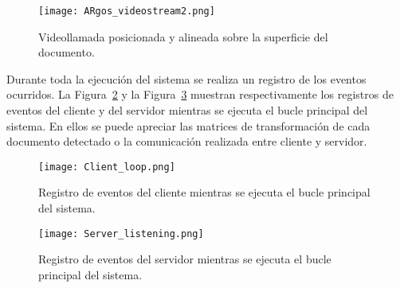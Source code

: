 \begin{figure}
  \begin{center}
    \texttt{[image: ARgos\_videostream2.png]}
    \caption{Videollamada posicionada y alineada sobre la superficie del documento.}
    \label{fig:ARgos_videostream2}
  \end{center}
\end{figure}

Durante toda la ejecución del sistema se realiza un registro de los eventos ocurridos. La Figura~\ref{fig:Client_loop} y la Figura~\ref{fig:Server_listening} muestran respectivamente los registros de eventos del cliente y
del servidor mientras se ejecuta el bucle principal del sistema. En ellos se puede apreciar las matrices de transformación de cada documento detectado o la comunicación realizada entre cliente y servidor.

\begin{figure}
  \begin{center}
    \texttt{[image: Client\_loop.png]}
    \caption{Registro de eventos del cliente mientras se ejecuta el bucle principal del sistema.}
    \label{fig:Client_loop}
  \end{center}
\end{figure}

\begin{figure}
  \begin{center}
    \texttt{[image: Server\_listening.png]}
    \caption{Registro de eventos del servidor mientras se ejecuta el bucle principal del sistema.}
    \label{fig:Server_listening}
  \end{center}
\end{figure}















